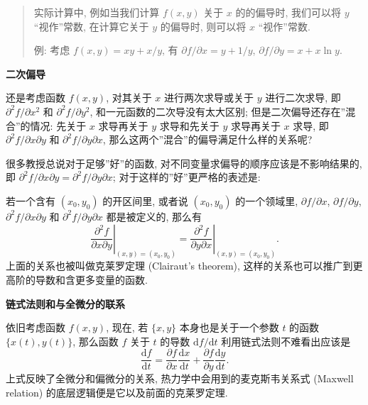 \begin{quote}
实际计算中, 例如当我们计算 \(f(x,y)\) 关于 \(x\) 的的偏导时, 我们可以将
\(y\) ``视作''常数, 在计算它关于 \(y\) 的偏导时, 则可以将 \(x\)
``视作''常数.

例: 考虑 \(f(x,y)=xy+x/y\), 有 \(\partial f/\partial x=y+1/y\),
\(\partial f/\partial y=x+x\ln y\).
\end{quote}

\textbf{二次偏导}

还是考虑函数 \(f(x,y)\), 对其关于 \(x\) 进行两次求导或关于 \(y\)
进行二次求导, 即 \(\partial^2f/\partial x^2\) 和
\(\partial^2f/\partial y^2\), 和一元函数的二次导没有太大区别;
但是二次偏导还存在''混合''的情况: 先关于 \(x\) 求导再关于 \(y\)
求导和先关于 \(y\) 求导再关于 \(x\) 求导, 即
\(\partial^2f/\partial x\partial y\) 和
\(\partial^2f/\partial y\partial x\),
那么这两个''混合''的偏导满足什么样的关系呢?

很多教授总说对于足够''好''的函数,
对不同变量求偏导的顺序应该是不影响结果的, 即
\(\partial^2f/\partial x\partial y=\partial^2f/\partial y\partial x\);
对于这样的''好''更严格的表述是:

若一个含有 \((x_0,y_0)\) 的开区间里, 或者说 \((x_0,y_0)\) 的一个领域里,
\(\partial f/\partial x\), \(\partial f/\partial y\),
\(\partial^2f/\partial x\partial y\) 和
\(\partial^2f/\partial y\partial x\) 都是被定义的, 那么有 \[
\left.\frac{\partial^2f}{\partial x\partial y}\right|_{(x,y)=(x_0,y_0)}=\left.\frac{\partial^2f}{\partial y\partial x}\right|_{(x,y)=(x_0,y_0)}.
\] 上面的关系也被叫做克莱罗定理 (Clairaut's theorem),
这样的关系也可以推广到更高阶的导数和含更多变量的函数.

\textbf{链式法则和与全微分的联系}

依旧考虑函数 \(f(x,y)\), 现在, 若 \(\{x,y\}\) 本身也是关于一个参数 \(t\)
的函数 \(\{x(t),y(t)\}\), 那么函数 \(f\) 关于 \(t\) 的导数
\(\mathrm{d}f/\mathrm{d}t\) 利用链式法则不难看出应该是 \[
\boxed{\frac{\mathrm{d}f}{\mathrm{d}t}=\frac{\partial f}{\partial x}\frac{\mathrm{d}x}{\mathrm{d}t}+\frac{\partial f}{\partial y}\frac{\mathrm{d}y}{\mathrm{d}t}}.
\] 上式反映了全微分和偏微分的关系, 热力学中会用到的麦克斯韦关系式
(Maxwell relation) 的底层逻辑便是它以及前面的克莱罗定理.
